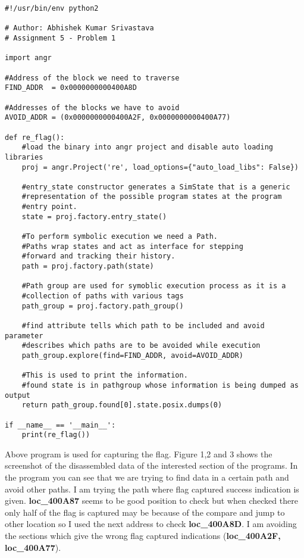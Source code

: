\documentclass[a4paper, 12pt]{article}
\begin{document}
\begin{lstlisting}
#!/usr/bin/env python2

# Author: Abhishek Kumar Srivastava
# Assignment 5 - Problem 1

import angr

#Address of the block we need to traverse
FIND_ADDR  = 0x0000000000400A8D

#Addresses of the blocks we have to avoid
AVOID_ADDR = (0x0000000000400A2F, 0x0000000000400A77)

def re_flag():
    #load the binary into angr project and disable auto loading libraries
    proj = angr.Project('re', load_options={"auto_load_libs": False})
    
    #entry_state constructor generates a SimState that is a generic
    #representation of the possible program states at the program 
    #entry point.
    state = proj.factory.entry_state()
    
    #To perform symbolic execution we need a Path.
    #Paths wrap states and act as interface for stepping 
    #forward and tracking their history.
    path = proj.factory.path(state)
    
    #Path group are used for symoblic execution process as it is a
    #collection of paths with various tags
    path_group = proj.factory.path_group()
    
    #find attribute tells which path to be included and avoid parameter 
    #describes which paths are to be avoided while execution
    path_group.explore(find=FIND_ADDR, avoid=AVOID_ADDR)
    
    #This is used to print the information.
    #found state is in pathgroup whose information is being dumped as output 
    return path_group.found[0].state.posix.dumps(0)

if __name__ == '__main__':
    print(re_flag())

\end{lstlisting}
Above program is used for capturing the flag. Figure 1,2 and 3 shows the screenshot of the disassembled data of the interested section of the programs. In the program you can see that we are trying to find data in a certain path and avoid other paths. I am trying the path where flag captured success indication is given. \textbf{loc\_400A87} seems to be good position to check but when checked there only half of the flag is captured may be because of the compare and jump to other location so I used the next address to check \textbf{loc\_400A8D}. I am avoiding the sections which give the wrong flag captured indications (\textbf{loc\_400A2F, loc\_400A77}).
\end{document}
